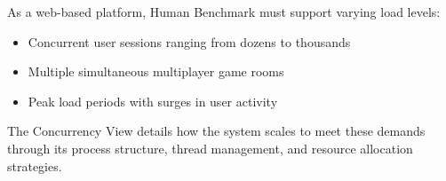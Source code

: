 As a web-based platform, Human Benchmark must support varying load levels:

\begin{itemize}
    \item Concurrent user sessions ranging from dozens to thousands
    \item Multiple simultaneous multiplayer game rooms
    \item Peak load periods with surges in user activity
\end{itemize}

The Concurrency View details how the system scales to meet these demands through its process structure, thread management, and resource allocation strategies.



    
    


